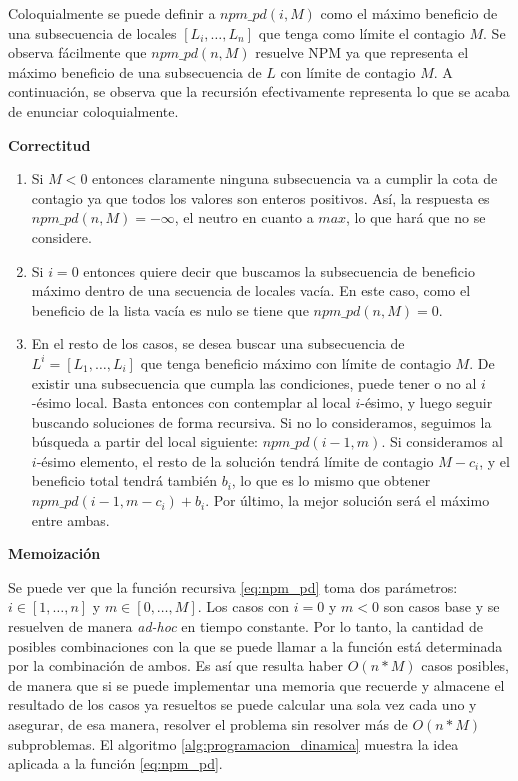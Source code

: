 Coloquialmente se puede definir a $npm\_pd(i, M)$ como el máximo beneficio de una subsecuencia de locales $[L_i,\dots,L_n]$ que tenga como límite el contagio $M$. Se observa fácilmente que $npm\_pd(n, M)$ resuelve NPM ya que representa el máximo beneficio de una subsecuencia de $L$ con límite de contagio $M$. A continuación, se observa que la recursión efectivamente representa lo que se acaba de enunciar coloquialmente.

\textbf{Correctitud}

\begin{enumerate}[label=\alph*.]
    \item Si $M<0$ entonces claramente ninguna subsecuencia va a cumplir la cota de contagio ya que todos los valores son enteros positivos. Así, la respuesta es $npm\_pd(n,M) = -\infty$, el neutro en cuanto a $max$, lo que hará que no se considere.

    \item Si $i=0$ entonces quiere decir que buscamos la subsecuencia de beneficio máximo dentro de una secuencia de locales vacía. En este caso, como el beneficio de la lista vacía es nulo se tiene que $npm\_pd(n,M) = 0$.
    
    \item En el resto de los casos, se desea buscar una subsecuencia de $L^i=[L_1,\dots,L_i]$ que tenga beneficio máximo con límite de contagio $M$. De existir una subsecuencia que cumpla las condiciones, puede tener o no al $i$-ésimo local. Basta entonces con contemplar al local $i$-ésimo, y luego seguir buscando soluciones de forma recursiva. Si no lo consideramos, seguimos la búsqueda a partir del local siguiente: $npm\_pd(i-1,m)$. Si consideramos al $i$-ésimo elemento, el resto de la solución tendrá límite de contagio $M - c_i$, y el beneficio total tendrá también $b_i$, lo que es lo mismo que obtener $npm\_pd(i-1, m-c_i) + b_i$. Por último, la mejor solución será el máximo entre ambas.
\end{enumerate}

\textbf{Memoización}

Se puede ver que la función recursiva \ref{eq:npm_pd} toma dos parámetros: $i \in [1,\dots,n]$ y $m \in [0,\dots,M]$. Los casos con $i=0$ y $m<0$ son casos base y se resuelven de manera \textit{ad-hoc} en tiempo constante. Por lo tanto, la cantidad de posibles combinaciones con la que se puede llamar a la función está determinada por la combinación de ambos. Es así que resulta haber $O(n*M)$ casos posibles, de manera que si se puede implementar una memoria que recuerde y almacene el resultado de los casos ya resueltos se puede calcular una sola vez cada uno y asegurar, de esa manera, resolver el problema sin resolver más de $O(n*M)$ subproblemas. El algoritmo \ref{alg:programacion_dinamica} muestra la idea aplicada a la función \ref{eq:npm_pd}.

